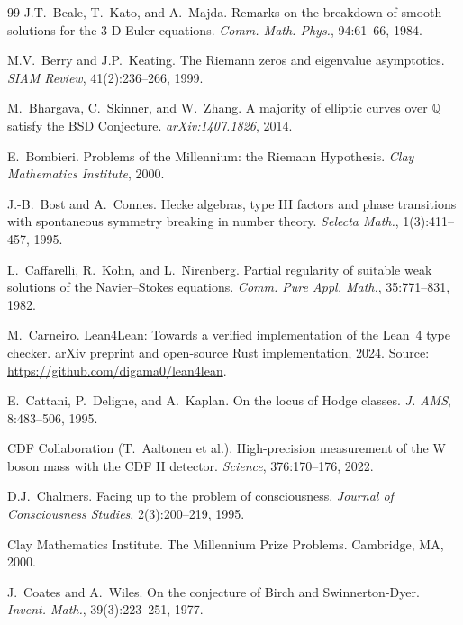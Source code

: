 \documentclass[11pt,a4paper]{amsart}
\theoremstyle{plain}
\theoremstyle{definition}
\begin{document}
\begin{thebibliography}{99}
J.T.~Beale, T.~Kato, and A.~Majda.
\newblock Remarks on the breakdown of smooth solutions for the 3-D Euler equations.
\newblock \emph{Comm. Math. Phys.}, 94:61--66, 1984.

M.V.~Berry and J.P.~Keating.
\newblock The Riemann zeros and eigenvalue asymptotics.
\newblock \emph{SIAM Review}, 41(2):236--266, 1999.

M.~Bhargava, C.~Skinner, and W.~Zhang.
\newblock A majority of elliptic curves over $\mathbb{Q}$ satisfy the BSD Conjecture.
\newblock \emph{arXiv:1407.1826}, 2014.

E.~Bombieri.
\newblock Problems of the Millennium: the Riemann Hypothesis.
\newblock \emph{Clay Mathematics Institute}, 2000.

J.-B.~Bost and A.~Connes.
\newblock Hecke algebras, type III factors and phase transitions with spontaneous symmetry breaking in number theory.
\newblock \emph{Selecta Math.}, 1(3):411--457, 1995.

L.~Caffarelli, R.~Kohn, and L.~Nirenberg.
\newblock Partial regularity of suitable weak solutions of the Navier--Stokes equations.
\newblock \emph{Comm. Pure Appl. Math.}, 35:771--831, 1982.

M.~Carneiro.
\newblock Lean4Lean: Towards a verified implementation of the Lean~4 type checker.
\newblock arXiv preprint and open-source Rust implementation, 2024. Source: \url{https://github.com/digama0/lean4lean}.

E.~Cattani, P.~Deligne, and A.~Kaplan.
\newblock On the locus of Hodge classes.
\newblock \emph{J. AMS}, 8:483--506, 1995.

CDF Collaboration (T.~Aaltonen et al.).
\newblock High-precision measurement of the W boson mass with the CDF II detector.
\newblock \emph{Science}, 376:170--176, 2022.

D.J.~Chalmers.
\newblock Facing up to the problem of consciousness.
\newblock \emph{Journal of Consciousness Studies}, 2(3):200--219, 1995.

Clay Mathematics Institute.
\newblock The Millennium Prize Problems.
\newblock Cambridge, MA, 2000.

J.~Coates and A.~Wiles.
\newblock On the conjecture of Birch and Swinnerton-Dyer.
\newblock \emph{Invent. Math.}, 39(3):223--251, 1977.


\end{thebibliography}
\end{document}
